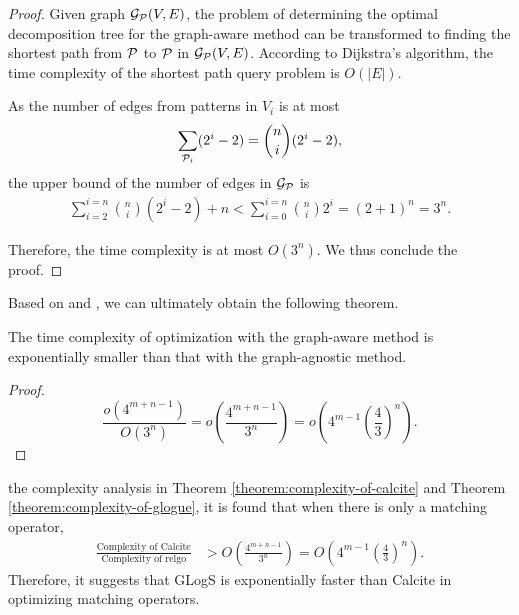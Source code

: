 \begin{proof}
    Given graph $\mathcal{G}_{\mathcal{P}}(V, E)$, the problem of determining the optimal decomposition tree for the graph-aware method can be transformed to finding the shortest path from $\mathcal{P}$ to $\pattern_{\empty}$ in $\mathcal{G}_{\mathcal{P}}(V, E)$.
    According to Dijkstra's algorithm, the time complexity of the shortest path query problem is $O(|E|)$.
    
    As the number of edges from patterns in $V_i$ is at most 
    \begin{equation*}
        \sum\limits_{\mathcal{P}_i}(2^i - 2) = \binom{n}{i}(2^i - 2),
    \end{equation*} 
    the upper bound of the number of edges in $\mathcal{G}_{\mathcal{P}}$ is
    \begin{equation*}
        \begin{split}
            \sum\limits_{i=2}^{i=n}\binom{n}{i}(2^i - 2) + n
            < \sum\limits_{i=0}^{i=n}\binom{n}{i}2^i = (2+1)^n 
             = 3^n.
        \end{split}
    \end{equation*}

    Therefore, the time complexity is at most $O(3^n)$.
    We thus conclude the proof.
\end{proof}

Based on  and , we can ultimately obtain the following theorem.

\begin{theorem}
    \label{thm:compare-search-space}
    The time complexity of optimization with the graph-aware method is exponentially smaller than that with the graph-agnostic method.
\end{theorem}
\begin{proof}
    \begin{equation*}
        \frac{o(4^{m+n-1})}{O(3^n)} = o(\frac{4^{m+n-1}}{3^n}) = o(4^{m-1}(\frac{4}{3})^n).
    \end{equation*}
\end{proof}

\iffalse
the complexity analysis in Theorem \ref{theorem:complexity-of-calcite} and Theorem \ref{theorem:complexity-of-glogue}, it is found that when there is only a matching operator,
\begin{equation*}
    \begin{split}
        \frac{\text{Complexity of Calcite}}{\text{Complexity of relgo}} & > O(\frac{4^{m+n-1}}{3^n}) = O(4^{m-1}(\frac{4}{3})^n).
    \end{split}
\end{equation*}
Therefore, it suggests that GLogS is exponentially faster than Calcite in optimizing matching operators.

